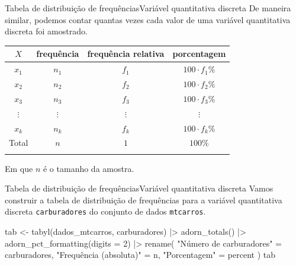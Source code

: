\documentclass[
  10pt,
  ignorenonframetext,
]{beamer}
\newenvironment{Shaded}{\begin{snugshade}}{\end{snugshade}}
\newcommand{\AttributeTok}[1]{\textcolor[rgb]{0.40,0.45,0.13}{#1}}
\newcommand{\DecValTok}[1]{\textcolor[rgb]{0.68,0.00,0.00}{#1}}
\newcommand{\FunctionTok}[1]{\textcolor[rgb]{0.28,0.35,0.67}{#1}}
\newcommand{\NormalTok}[1]{\textcolor[rgb]{0.00,0.23,0.31}{#1}}
\newcommand{\OtherTok}[1]{\textcolor[rgb]{0.00,0.23,0.31}{#1}}
\newcommand{\SpecialCharTok}[1]{\textcolor[rgb]{0.37,0.37,0.37}{#1}}
\newcommand{\StringTok}[1]{\textcolor[rgb]{0.13,0.47,0.30}{#1}}
\begin{document}
\begin{frame}{Tabela de distribuição de frequências\newline Variável
quantitativa discreta}
\protect\hypertarget{tabela-de-distribuiuxe7uxe3o-de-frequuxeanciasvariuxe1vel-quantitativa-discreta-2}{}
De maneira similar, podemos contar quantas vezes cada valor de uma
variável quantitativa discreta foi amostrado.

\begin{longtable}[]{@{}cccc@{}}
\toprule\noalign{}
\(X\) & frequência & frequência relativa & porcentagem \\
\midrule\noalign{}
\endhead
\(x_1\) & \(n_1\) & \(f_1\) & \(100\cdot f_1 \%\) \\
\(x_2\) & \(n_2\) & \(f_2\) & \(100\cdot f_2 \%\) \\
\(x_3\) & \(n_3\) & \(f_3\) & \(100\cdot f_3 \%\) \\
\(\vdots\) & \(\vdots\) & \(\vdots\) & \(\vdots\) \\
\(x_k\) & \(n_k\) & \(f_k\) & \(100\cdot f_k \%\) \\
Total & \(n\) & \(1\) & \(100 \%\) \\
\bottomrule\noalign{}
\end{longtable}

Em que \(n\) é o tamanho da amostra.
\end{frame}

\begin{frame}[fragile]{Tabela de distribuição de
frequências\newline Variável quantitativa discreta}
\protect\hypertarget{tabela-de-distribuiuxe7uxe3o-de-frequuxeanciasvariuxe1vel-quantitativa-discreta-3}{}
Vamos construir a tabela de distribuição de frequências para a variável
quantitativa discreta \texttt{carburadores} do conjunto de dados
\texttt{mtcarros}.

\begin{Shaded}
\begin{Highlighting}[]
\NormalTok{tab }\OtherTok{\textless{}{-}} \FunctionTok{tabyl}\NormalTok{(dados\_mtcarros, carburadores) }\SpecialCharTok{|\textgreater{}}
  \FunctionTok{adorn\_totals}\NormalTok{() }\SpecialCharTok{|\textgreater{}}
  \FunctionTok{adorn\_pct\_formatting}\NormalTok{(}\AttributeTok{digits =} \DecValTok{2}\NormalTok{) }\SpecialCharTok{|\textgreater{}}
  \FunctionTok{rename}\NormalTok{(}
    \StringTok{"Número de carburadores"} \OtherTok{=}\NormalTok{ carburadores,}
    \StringTok{"Frequência (absoluta)"} \OtherTok{=}\NormalTok{ n,}
    \StringTok{"Porcentagem"} \OtherTok{=}\NormalTok{ percent}
\NormalTok{  )}
\NormalTok{tab}
\end{Highlighting}
\end{Shaded}
\end{frame}
\end{document}
